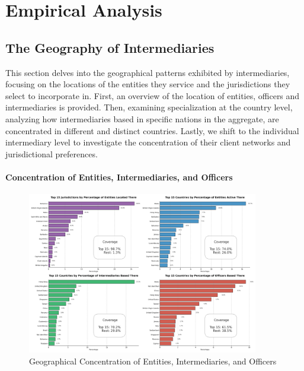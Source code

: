 \chapter{Empirical Analysis}
\label{chap:empirical_analysis}

\section{The Geography of Intermediaries}
\label{sec:geographical_specialisation}

This section delves into the geographical patterns exhibited by intermediaries, focusing on the locations of the entities they service and the jurisdictions they select to incorporate in. First, an overview of the location of entities, officers and intermediaries is provided. Then, examining specialization at the country level, analyzing how intermediaries based in specific nations in the aggregate, are concentrated in different and distinct countries. Lastly, we shift to the individual intermediary level to investigate the concentration of their client networks and jurisdictional preferences.

\subsubsection{Concentration of Entities, Intermediaries, and Officers}

\label{subsubsec:concentration_elements}

\begin{figure}[htbp]
    \centering
    \includegraphics[width=0.9\textwidth]{images/Preliminary_Geography_Overview.png} 
    \caption{Geographical Concentration of Entities, Intermediaries, and Officers}
    \label{fig:preliminary_geography_overview}
\end{figure}

